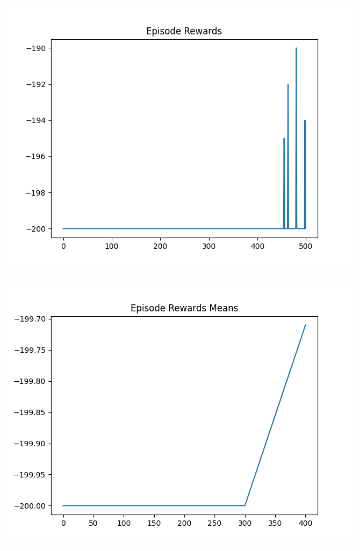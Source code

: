 \begin{figure}[H]
\begin{subfigure}{.47\linewidth}
        \includegraphics[width=\textwidth]{mountain/2024-06-15_12-31-16_dqn_mountaincar_episode_rewards.png}
    \end{subfigure}
    \begin{subfigure}{.47\linewidth}
        \centering
        \includegraphics[width=\textwidth]{mountain/2024-06-15_12-31-16_dqn_mountaincar_episode_rewards_means.png}
    \end{subfigure}
\end{figure}
